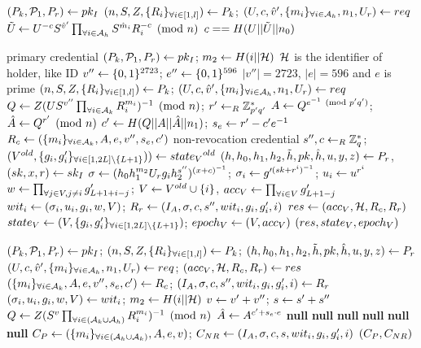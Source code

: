\documentclass{article}
\begin{document}
\begin{algorithm}
\caption{$\verifyph$}
\label{alg:verifyreq}
\begin{algorithmic}
	\State $\pkip \la \pki $
	\State $\pkp \la \pk $; $\reqp  \la req$
	\State $\zkv{U}{}{c}{S}{v}{'}\prodi{i}{\ah}{S^{\hat{m}_{i}}R_{i}^{-c}}\pmod{n}$
	\State \Return $c == H(U||\td{U}||n_{0})$
\end{algorithmic}
\end{algorithm}

\begin{algorithm}
\caption{$\crresp$}
\label{alg:res}
\begin{algorithmic}
	\State \Comment primary credential
	\State $\pkip \la \pki $; $m_{2}\la H(i||\mch )$
	\Comment $\mch $ is the identifier of holder, like ID
	\State $v''\la \binbits{2723}$; $e''\la \binbits{596}$
	\Comment $|v''|= 2723$, $|e| = 596$ and $e$ is prime
	\State $\pkp \la \pk $; $\reqp  \la req$
	\State $Q\la Z(US^{v''}\prodi{i}{\ak}{R_{i}^{m_{i}}})^{-1}\pmod{n}$; $r'\lar \mbz{p'q'}$
	\State $A\la Q^{e^{-1}\pmod{p'q'}}$; $\hat{A}\la Q^{r'}\pmod{n}$
	\State $c'\la H(Q||A||\hat{A}||n_{1})$; $s_{e}\la r' -c'e^{-1}$
	\State $\rc \la \rcp$
	\State \Comment non-revocation credential
	\State $s'', c\lar \mbz{q}$; $(\old{V}, \stpp )\la \old{\stv }$
	\State $\prp \la \pr $, $(sk, x, r)\la \ski $
	\State $\sigma \la (h_{0}h_{1}^{m_{2}}U_{r}g_{i}h_{2}^{s''})^{(x+c)^{-1}}$; $\sigma _{i} \la g'^{(sk + r^{i})^{-1}}$; $u_{i}\la u^{r^{i}}$
	\State $w\la \prodi{j}{V, j\neq i}{\gllij }$; $V\la \old{V}\cup \{i\}$, $\accv \la \prodi{i}{V} \gllj$
	\State $\witi \la \witip $; $\rr \la \rrp $
	\State $res \la \resp $
	\State $\stv \la \stp $; $\epv \la \epp $
	\State \Return $\crrespp $
\end{algorithmic}
\end{algorithm}

\begin{algorithm}
\caption{$\crfinishp $}
\label{alg:ci3}
\begin{algorithmic}
	\State $\pkip \la \pki $; $\pkp \la \pk $; 
	\State $\prp \la \pr $
	\State $\reqp \la req$; $\resp \la res$
	\State $\rcp \la \rc $; $\rrp \la \rr $
	\State $\witip \la \witi$; $m_2\la H(i||\mch )$
	\State $v\la v' + v''$; $s\la s' + s''$
	\State $Q\la Z(S^{v}\prodi{i}{(\ak \cup \ah)}{R_{i}^{m_{i}}})^{-1}\pmod{n}$
	\State $\hat{A}\la A^{c'+s_{e}\cdot e}$
		\State \Return \textbf{null}
		\State \Return \textbf{null}
		\State \Return \textbf{null}
		\State \Return \textbf{null}
		\State \Return \textbf{null}
		\State \Return \textbf{null}
	\Else \State $\cp \la \cpp$; $\cnr \la \cnrp$
	\State \Return $(\cpnr )$
	\EndIf
\end{algorithmic}
\end{algorithm}
\end{document}

